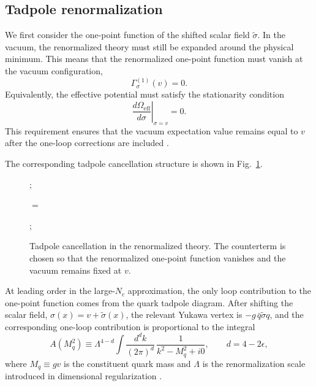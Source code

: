 \subsection{Tadpole renormalization}

We first consider the one-point function of the shifted scalar field
\(\tilde{\sigma}\). In the vacuum, the renormalized theory must still
be expanded around the physical minimum. This means that the
renormalized one-point function must vanish at the vacuum
configuration,
\begin{equation}
\Gamma^{(1)}_{\sigma}(v)=0 .
\label{eq:qm_tadpole_condition}
\end{equation}
Equivalently, the effective potential must satisfy the stationarity
condition
\begin{equation}
\left.
\frac{d\Omega_{\mathrm{eff}}}{d\sigma}
\right|_{\sigma=v}
=0 .
\label{eq:qm_stationarity_condition}
\end{equation}
This requirement ensures that the vacuum expectation value remains
equal to \(v\) after the one-loop corrections are included
\cite{Folkestad2018,Andersen2024}.

The corresponding tadpole cancellation structure is shown in
Fig.~\ref{fig:qm_tadpole_cancellation}.

\begin{figure}[H]
\centering
\begin{minipage}{0.4\textwidth}
\raggedleft
{};
\end{minipage}
\begin{minipage}{0.1\textwidth}
\centering
\(
=
\)
\end{minipage}
\begin{minipage}{0.4\textwidth}
\raggedright
{};
\end{minipage}
\caption{Tadpole cancellation in the renormalized theory. The counterterm is chosen so that the renormalized one-point function vanishes and the vacuum remains fixed at \(v\).}
\label{fig:qm_tadpole_cancellation}
\end{figure}

At leading order in the large-\(N_c\) approximation, the only loop
contribution to the one-point function comes from the quark tadpole
diagram. After shifting the scalar field,
\(\sigma(x)=v+\tilde{\sigma}(x)\), the relevant Yukawa vertex is
\(-g\,\bar q \tilde{\sigma} q\), and the corresponding one-loop
contribution is proportional to the integral
\begin{equation}
A(M_q^2)
\equiv
\Lambda^{4-d}
\int \frac{d^d k}{(2\pi)^d}\,
\frac{1}{k^2-M_q^2+i0},
\qquad d=4-2\epsilon ,
\label{eq:qm_A_integral}
\end{equation}
where \(M_q \equiv gv\) is the constituent quark mass and \(\Lambda\)
is the renormalization scale introduced in dimensional
regularization \cite{Folkestad2018,Andersen2024}.


